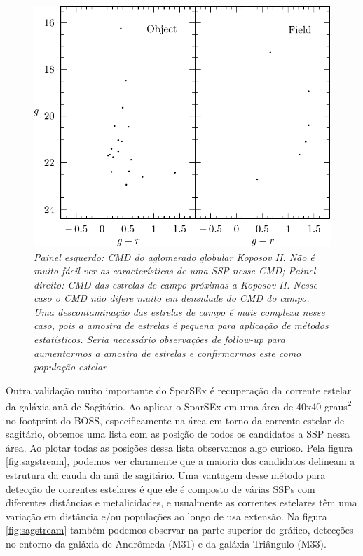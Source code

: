 \documentclass[
	12pt,				%
	openany,			%
	oneside,			%
	a4paper,			%
	english,			%
	brazil				%
	]{abntex2}
\begin{document}
\begin{figure}[H]
\begin{center}
\includegraphics[width=12cm]{figuras/cmdKoposov2_rxgr.pdf}
\caption{\textit{Painel esquerdo: CMD do aglomerado globular  Koposov II. Não é muito fácil ver as características de uma SSP nesse CMD; Painel direito: CMD das estrelas de campo próximas a Koposov II. Nesse caso o CMD não difere muito em densidade do CMD do campo. Uma descontaminação das estrelas de campo é mais complexa nesse caso, pois a amostra de estrelas é pequena para aplicação de métodos estatísticos. Seria necessário observações de follow-up para aumentarmos a amostra de estrelas e confirmarmos este como população estelar \cite{2007ApJ...669..337K}}}

\label{fig:cmdKoII}
\end{center}
\end{figure}
\vspace{0.5cm}

Outra validação muito importante do SparSEx é recuperação da corrente estelar da galáxia anã de Sagitário. Ao aplicar o SparSEx em uma área de 40x40 graus\textsuperscript{2} no footprint do BOSS, especificamente na área em torno da corrente estelar de sagitário, obtemos uma lista com as posição de todos os candidatos a SSP nessa área. Ao plotar todas as posições dessa lista observamos algo curioso. Pela figura \ref{fig:sagstream}, podemos ver claramente que a maioria dos candidatos delineam a estrutura da cauda da anã de sagitário. Uma vantagem desse método para detecção de correntes estelares é que ele é composto de várias SSPs com diferentes distâncias e metalicidades, e usualmente as correntes estelares têm uma variação em distância e/ou populações ao longo de usa extensão. Na figura \ref{fig:sagstream} também podemos observar na parte superior do gráfico, detecções no entorno da galáxia de Andrômeda (M31) e da galáxia Triângulo (M33).
\end{document}
